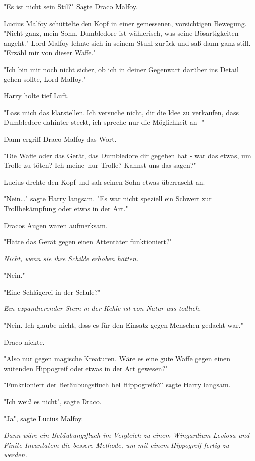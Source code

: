 {"Es ist nicht sein Stil?" Sagte Draco Malfoy.

Lucius Malfoy schüttelte den Kopf in einer gemessenen, vorsichtigen Bewegung. "Nicht ganz, mein Sohn. Dumbledore ist wählerisch, was seine Bösartigkeiten angeht." Lord Malfoy lehnte sich in seinem Stuhl zurück und saß dann ganz still. "Erzähl mir von dieser Waffe."

"Ich bin mir noch nicht sicher, ob ich in deiner Gegenwart darüber ins Detail gehen sollte, Lord Malfoy."

Harry holte tief Luft.

"Lass mich das klarstellen. Ich versuche nicht, dir die Idee zu verkaufen, dass Dumbledore dahinter steckt, ich spreche nur die Möglichkeit an -"

Dann ergriff Draco Malfoy das Wort.

"Die Waffe oder das Gerät, das Dumbledore dir gegeben hat - war das etwas, um Trolle zu töten? Ich meine, nur Trolle? Kannst uns das sagen?"

Lucius drehte den Kopf und sah seinen Sohn etwas überrascht an.

"Nein…" sagte Harry langsam. "Es war nicht speziell ein Schwert zur Trollbekämpfung oder etwas in der Art."

Dracos Augen waren aufmerksam.

"Hätte das Gerät gegen einen Attentäter funktioniert?"

\emph{Nicht, wenn sie ihre Schilde erhoben hätten.}

"Nein."

"Eine Schlägerei in der Schule?"

\emph{Ein expandierender Stein in der Kehle ist von Natur aus tödlich.}

"Nein. Ich glaube nicht, dass es für den Einsatz gegen Menschen gedacht war."

Draco nickte.

"Also nur gegen magische Kreaturen. Wäre es eine gute Waffe gegen einen wütenden Hippogreif oder etwas in der Art gewesen?"

"Funktioniert der Betäubungsfluch bei Hippogreifs?" sagte Harry langsam.

"Ich weiß es nicht", sagte Draco.

"Ja", sagte Lucius Malfoy.

\emph{Dann wäre ein Betäubungsfluch im Vergleich zu einem Wingardium Leviosa und Finite Incantatem die bessere Methode, um mit einem Hippogreif fertig zu werden.}

}
